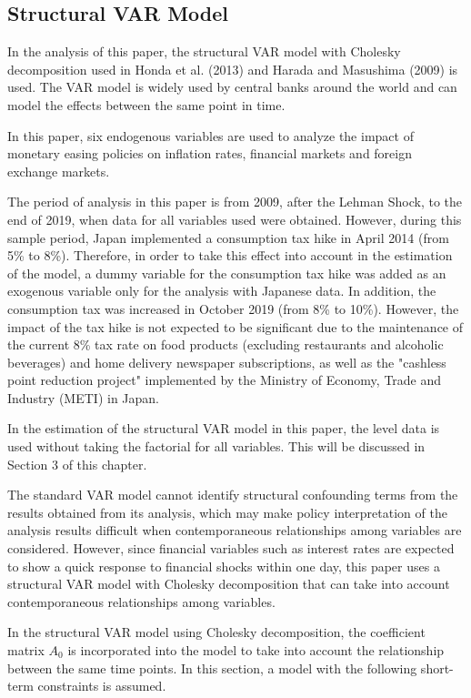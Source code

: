 \documentclass[12pt]{article}
\begin{document}
\subsection{Structural VAR Model}

In the analysis of this paper, the structural VAR model with Cholesky decomposition used in Honda et al. (2013) and Harada and Masushima (2009) is used.
The VAR model is widely used by central banks around the world and can model the effects between the same point in time.

In this paper, six endogenous variables are used to analyze the impact of monetary easing policies on inflation rates, financial markets and foreign exchange markets.

The period of analysis in this paper is from 2009, after the Lehman Shock, to the end of 2019, when data for all variables used were obtained.
However, during this sample period, Japan implemented a consumption tax hike in April 2014 (from 5\% to 8\%).
Therefore, in order to take this effect into account in the estimation of the model, a dummy variable for the consumption tax hike was added as an exogenous variable only for the analysis with Japanese data.
In addition, the consumption tax was increased in October 2019 (from 8\% to 10\%).
However, the impact of the tax hike is not expected to be significant due to the maintenance of the current 8\% tax rate on food products (excluding restaurants and alcoholic beverages) and home delivery newspaper subscriptions, as well as the "cashless point reduction project" implemented by the Ministry of Economy, Trade and Industry (METI) in Japan.

In the estimation of the structural VAR model in this paper, the level data is used without taking the factorial for all variables. This will be discussed in Section 3 of this chapter.

The standard VAR model cannot identify structural confounding terms from the results obtained from its analysis, which may make policy interpretation of the analysis results difficult when contemporaneous relationships among variables are considered.
However, since financial variables such as interest rates are expected to show a quick response to financial shocks within one day, this paper uses a structural VAR model with Cholesky decomposition that can take into account contemporaneous relationships among variables.

In the structural VAR model using Cholesky decomposition, the coefficient matrix $A_0$ is incorporated into the model to take into account the relationship between the same time points.
In this section, a model with the following short-term constraints is assumed.
\end{document}
